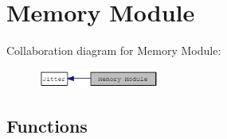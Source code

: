 \hypertarget{group__memorymod}{
\section{Memory Module}
\label{group__memorymod}
}


Collaboration diagram for Memory Module:\nopagebreak
\begin{figure}[H]
\begin{center}
\leavevmode
\includegraphics[width=113pt]{group__memorymod}
\end{center}
\end{figure}
\subsection*{Functions}
